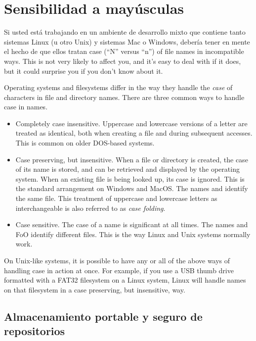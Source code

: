 \section{Sensibilidad a mayúsculas}
\label{sec:names:case}

Si usted está trabajando en un ambiente de desarrollo mixto que
contiene tanto sistemas Linux (u otro Unix) y sistemas Mac o Windows,
debería tener en mente el hecho de que ellos tratan 
case (``N'' versus ``n'') of file names in incompatible ways.  This is
not very likely to affect you, and it's easy to deal with if it does,
but it could surprise you if you don't know about it.

Operating systems and filesystems differ in the way they handle the
\emph{case} of characters in file and directory names.  There are
three common ways to handle case in names.
\begin{itemize}
\item Completely case insensitive.  Uppercase and lowercase versions
  of a letter are treated as identical, both when creating a file and
  during subsequent accesses.  This is common on older DOS-based
  systems.
\item Case preserving, but insensitive.  When a file or directory is
  created, the case of its name is stored, and can be retrieved and
  displayed by the operating system.  When an existing file is being
  looked up, its case is ignored.  This is the standard arrangement on
  Windows and MacOS.  The names  and 
  identify the same file.  This treatment of uppercase and lowercase
  letters as interchangeable is also referred to as \emph{case
    folding}.
\item Case sensitive.  The case of a name is significant at all times.
  The names  and {FoO} identify different files.  This
  is the way Linux and Unix systems normally work.
\end{itemize}

On Unix-like systems, it is possible to have any or all of the above
ways of handling case in action at once.  For example, if you use a
USB thumb drive formatted with a FAT32 filesystem on a Linux system,
Linux will handle names on that filesystem in a case preserving, but
insensitive, way.

\subsection{Almacenamiento portable y seguro de repositorios}

